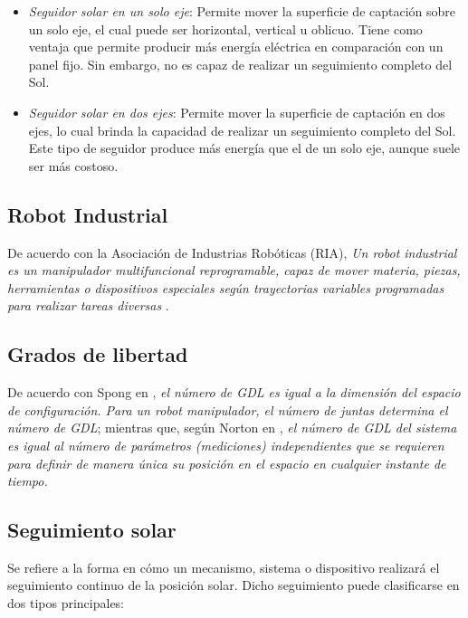 \begin{itemize}
	\item \textit{Seguidor solar en un solo eje}: Permite mover la superficie de captación sobre un solo eje, el cual puede ser horizontal, vertical u oblicuo. Tiene como ventaja que permite producir más energía eléctrica en comparación con un panel fijo. Sin embargo, no es capaz de realizar un seguimiento completo del Sol.
	\item \textit{Seguidor solar en dos ejes}: Permite mover la superficie de captación en dos ejes, lo cual brinda la capacidad de realizar un seguimiento completo del Sol. Este tipo de seguidor produce más energía que el de un solo eje, aunque suele ser más costoso.
\end{itemize}

\subsection{Robot Industrial}
De acuerdo con la Asociación de Industrias Robóticas (RIA), \textit{Un robot industrial es un manipulador multifuncional reprogramable, capaz de mover materia, piezas, herramientas o dispositivos especiales según trayectorias variables programadas para realizar tareas diversas} \cite{M6}.

\subsection{Grados de libertad}
De acuerdo con Spong en \cite{M7}, \textit{el número de GDL es igual a la dimensión del espacio de configuración. Para un robot manipulador, el número de juntas determina el número de GDL}; mientras que, según Norton en \cite{M8}, \textit{el número de GDL del sistema es igual al número de parámetros (mediciones) independientes que se requieren para definir de manera única su posición en el espacio en cualquier instante de tiempo.}

\subsection{Seguimiento solar}
Se refiere a la forma en cómo un mecanismo, sistema o dispositivo realizará el seguimiento continuo de la posición solar. Dicho seguimiento puede clasificarse en dos tipos principales:

